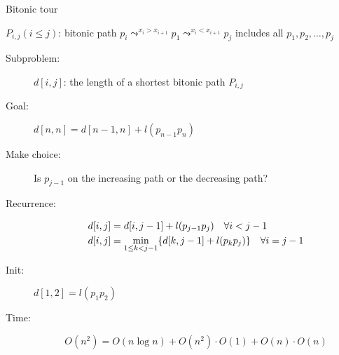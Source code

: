 \begin{frame}{Bitonic tour}
  \centerline{$P_{i,j} (i \le j)$: bitonic path $p_i \leadsto^{x_i > x_{i+1}} p_1 \leadsto^{x_i < x_{i+1}} p_j$ includes all $p_1, p_2, \dots, p_j$}

  \vspace{0.20cm}
  \begin{description}
	\item[Subproblem:] $d[i,j]$: the length of a shortest bitonic path $P_{i,j}$
	\item[Goal:] $d[n,n] = d[n-1, n] + l(p_{n-1}p_{n})$
	  \pause
	\item[Make choice:] Is $p_{j-1}$ on the increasing path or the decreasing path?
	\item[Recurrence:] 
	  \begin{align*}
		d[i,j] &=  d[i,j-1] + l(p_{j-1}p_j) \quad \forall i < j-1 \\
		d[i,j] &= \min_{1 \le k < j-1} \{d[k, j-1] + l(p_kp_j)\} \quad \forall i = j-1
	  \end{align*}
	  \pause
	\item[Init:] $d[1,2] = l(p_1p_2)$
	\item[Time:] 
	  \[
		O(n^2) = O(n \log n) + O(n^2) \cdot O(1) + O(n) \cdot O(n)
	  \]
  \end{description}
\end{frame}
